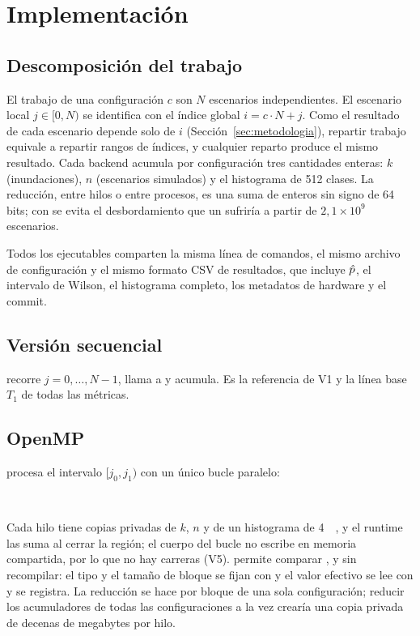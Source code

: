 \section{Implementación}
\label{sec:implementacion}

\subsection{Descomposición del trabajo}

El trabajo de una configuración $c$ son $N$ escenarios independientes. El escenario local $j\in[0,N)$ se identifica con el índice global $i = c\cdot N + j$. Como el resultado de cada escenario depende solo de $i$ (Sección~\ref{sec:metodologia}), repartir trabajo equivale a repartir rangos de índices, y cualquier reparto produce el mismo resultado. Cada backend acumula por configuración tres cantidades enteras: $k$ (inundaciones), $n$ (escenarios simulados) y el histograma de 512 clases. La reducción, entre hilos o entre procesos, es una suma de enteros sin signo de 64 bits; con  se evita el desbordamiento que un  sufriría a partir de $2{,}1\times10^{9}$ escenarios.

Todos los ejecutables comparten la misma línea de comandos, el mismo archivo de configuración y el mismo formato CSV de resultados, que incluye $\hat{p}$, el intervalo de Wilson, el histograma completo, los metadatos de hardware y el commit.

\subsection{Versión secuencial}

 recorre $j = 0,\dots,N-1$, llama a  y acumula. Es la referencia de V1 y la línea base $T_1$ de todas las métricas.

\subsection{OpenMP}

 procesa el intervalo $[j_0, j_1)$ con un único bucle paralelo:
\begin{center}
\small
{}\\
\end{center}
Cada hilo tiene copias privadas de $k$, $n$ y de un histograma de \qty{4}{\kilo\byte}, y el runtime las suma al cerrar la región; el cuerpo del bucle no escribe en memoria compartida, por lo que no hay carreras (V5).  permite comparar ,  y  sin recompilar: el tipo y el tamaño de bloque se fijan con  y el valor efectivo se lee con  y se registra. La reducción se hace por bloque de una sola configuración; reducir los acumuladores de todas las configuraciones a la vez crearía una copia privada de decenas de megabytes por hilo.

